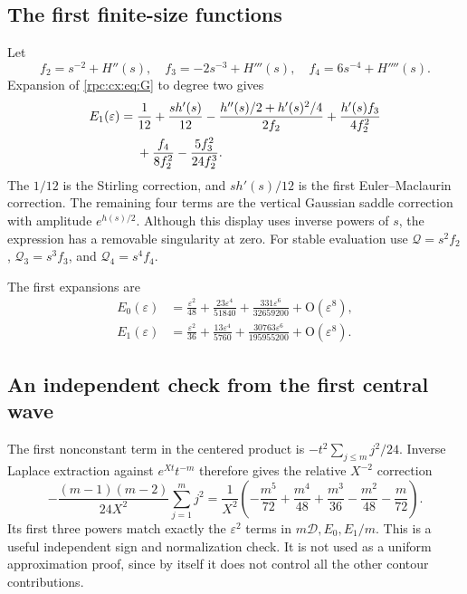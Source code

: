 \documentclass[11pt]{article}
\theoremstyle{definition}
\theoremstyle{remark}
\numberwithin{equation}{section}
\begin{document}
\subsection{The first finite-size functions}
Let
\begin{equation}
 f_2=s^{-2}+H''(s),\quad
 f_3=-2s^{-3}+H'''(s),\quad
 f_4=6s^{-4}+H''''(s).
\end{equation}
Expansion of \eqref{rpc:cx:eq:G} to degree two gives
\begin{align}\label{rpc:cx:eq:E1}
 E_1(\varepsilon)={}&\frac1{12}+\frac{s h'(s)}{12}
 -\frac{h''(s)/2+h'(s)^2/4}{2f_2}
 +\frac{h'(s)f_3}{4f_2^2}\notag\\
 &+\frac{f_4}{8f_2^2}-\frac{5f_3^2}{24f_2^3}.
\end{align}
The $1/12$ is the Stirling correction, and $s h'(s)/12$ is the first
Euler--Maclaurin correction. The remaining four terms are the vertical
Gaussian saddle correction with amplitude $e^{h(s)/2}$.
Although this display uses inverse powers of $s$, the expression has a
removable singularity at zero. For stable evaluation use
$\mathcal Q=s^2f_2$, $\mathcal Q_3=s^3f_3$, and $\mathcal Q_4=s^4f_4$.

The first expansions are
\begin{align}
 E_0(\varepsilon)&=\frac{\varepsilon^2}{48}
   +\frac{23\varepsilon^4}{51840}
   +\frac{331\varepsilon^6}{32659200}+\mathrm O(\varepsilon^8),\label{rpc:cx:eq:E0series}\\
 E_1(\varepsilon)&=\frac{\varepsilon^2}{36}
   +\frac{13\varepsilon^4}{5760}
   +\frac{30763\varepsilon^6}{195955200}+\mathrm O(\varepsilon^8).
       \label{rpc:cx:eq:E1series}
\end{align}

\subsection{An independent check from the first central wave}
The first nonconstant term in the centered product is
$-t^2\sum_{j\le m}j^2/24$. Inverse Laplace extraction against $e^{Xt}t^{-m}$
therefore gives the relative $X^{-2}$ correction
\begin{equation}\label{rpc:cx:eq:wavecheck}
 -\frac{(m-1)(m-2)}{24X^2}\sum_{j=1}^m j^2
 =\frac1{X^2}\left(-\frac{m^5}{72}+\frac{m^4}{48}
          +\frac{m^3}{36}-\frac{m^2}{48}-\frac m{72}\right).
\end{equation}
Its first three powers match exactly the $\varepsilon^2$ terms in
$m\mathcal D,E_0,E_1/m$. This is a useful independent sign and normalization
check. It is not used as a uniform approximation proof, since by itself
it does not control all the other contour contributions.
\end{document}
